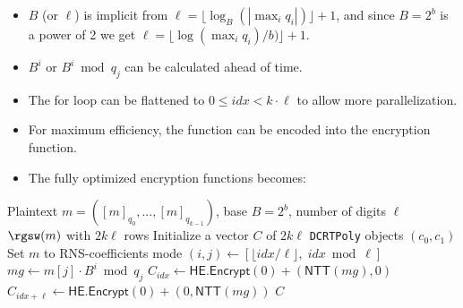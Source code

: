 \begin{itemize}
    \item $B$ (or $\ell$) is implicit from $\ell = \lfloor\log_{B}{(|\max_i{q_i}|)}\rfloor + 1$, and since $B = 2^b$ is a power of 2 we get $\ell = \lfloor \log(\max_i{q_i})/b)\rfloor + 1$.
    \item $B^i$ or $B^i \bmod{q_j}$ can be calculated ahead of time. 
    \item The for loop can be flattened to $0 \leq idx < k\cdot \ell$ to allow more parallelization.
    \item For maximum efficiency, the function can be encoded into the encryption function.
    \item The fully optimized encryption functions becomes:
\end{itemize}

\begin{algorithm}
\caption{Encrypt BV-RGSW (Optimized)}
\label{alg:bv:encrypt}
\begin{algorithmic}[1]
\Require Plaintext $m = ([m]_{q_0}, ..., [m]_{q_{k-1}})$, base $B = 2^{b}$, number of digits $\ell$
\Ensure $\rgsw(m)$ with $2k\ell$ rows
\State Initialize a vector $C$ of $2k\ell$ \texttt{DCRTPoly} objects $(c_0, c_1)$
\State Set $m$ to RNS-coefficients mode
\For{$idx \in [0, \ell\cdot k)$ \textbf{in parallel}}
    \State $(i, j) \gets [\lfloor idx / \ell \rfloor, \; idx \bmod{\ell}]$
    \State $mg \gets m[j] \cdot B^{i} \bmod{q_j}$
    \State $C_{idx} \gets \mathsf{HE.Encrypt}(0) + (\mathsf{NTT}(mg), 0)$
    \State $C_{idx + \ell} \gets \mathsf{HE.Encrypt}(0) + (0, \mathsf{NTT}(mg))$
\EndFor
\State \Return $C$
\end{algorithmic}
\end{algorithm}






